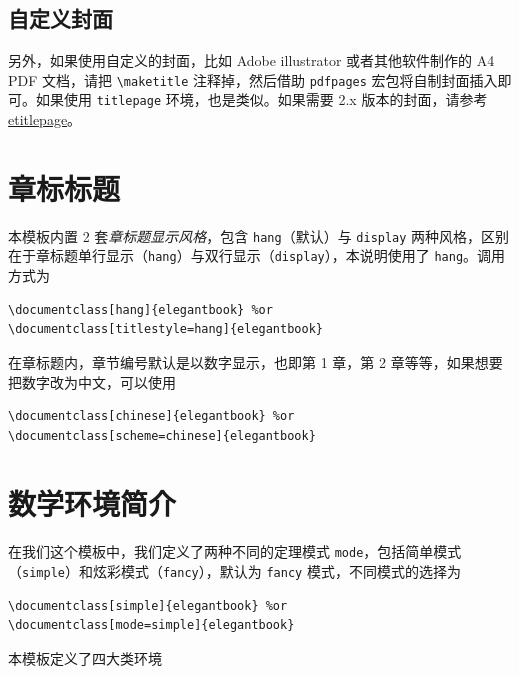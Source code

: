 \documentclass[lang=cn,newtx,10pt,scheme=chinese,pad,twocol]{zznote}
\begin{document}
\subsection{自定义封面}

另外，如果使用自定义的封面，比如 Adobe illustrator 或者其他软件制作的 A4 PDF 文档，请把 \lstinline{\maketitle} 注释掉，然后借助 \lstinline{pdfpages} 宏包将自制封面插入即可。如果使用 \lstinline{titlepage} 环境，也是类似。如果需要 2.x 版本的封面，请参考 \href{https://github.com/EthanDeng/etitlepage}{etitlepage}。

\section{章标标题}

本模板内置 2 套\textit{章标题显示风格}，包含 \lstinline{hang}（默认）与 \lstinline{display} 两种风格，区别在于章标题单行显示（\lstinline{hang}）与双行显示（\lstinline{display}），本说明使用了 \lstinline{hang}。调用方式为
\begin{lstlisting}
\documentclass[hang]{elegantbook} %or
\documentclass[titlestyle=hang]{elegantbook}
\end{lstlisting}

在章标题内，章节编号默认是以数字显示，也即{\kaishu 第 1 章}，{\kaishu 第 2 章}等等，如果想要把数字改为中文，可以使用
\begin{lstlisting}
\documentclass[chinese]{elegantbook} %or
\documentclass[scheme=chinese]{elegantbook}
\end{lstlisting}

\section{数学环境简介}

在我们这个模板中，我们定义了两种不同的定理模式 \lstinline{mode}，包括简单模式（\lstinline{simple}）和炫彩模式（\lstinline{fancy}），默认为 \lstinline{fancy} 模式，不同模式的选择为
\begin{lstlisting}
\documentclass[simple]{elegantbook} %or
\documentclass[mode=simple]{elegantbook}
\end{lstlisting}

本模板定义了四大类环境
\end{document}
